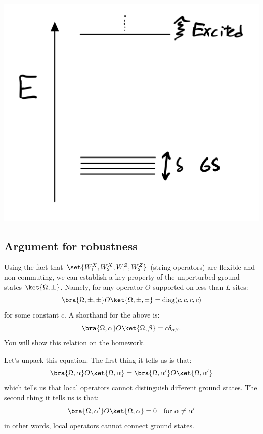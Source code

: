 \begin{center}
    \includegraphics[scale=0.3]{Lectures/Images/lec3-gsmanifold.png}
\end{center}

\subsection{Argument for robustness}
Using the fact that $\set{W_1^X, W_2^X, W_1^Z, W_2^Z}$ (string operators) are flexible and non-commuting, we can establish a key property of the unperturbed ground states $\ket{\Omega, \pm}$. Namely, for any operator $O$ supported on less than $L$ sites:
\begin{equation}\label{eq:star}
    \bra{\Omega, \pm, \pm}O\ket{\Omega, \pm, \pm} = \text{diag}(c, c, c, c)
\end{equation}
for some constant $c$. A shorthand for the above is:
\begin{equation}
    \bra{\Omega, \alpha}O\ket{\Omega, \beta} = c\delta_{\alpha\beta}.
\end{equation}
You will show this relation on the homework.

Let's unpack this equation. The first thing it tells us is that:
\begin{equation}
    \bra{\Omega, \alpha}O\ket{\Omega, \alpha} = \bra{\Omega, \alpha'}O\ket{\Omega, \alpha'}
\end{equation}
which tells us that local operators cannot distinguish different ground states. The second thing it tells us is that:
\begin{equation}
    \bra{\Omega, \alpha'}O\ket{\Omega, \alpha} = 0 \quad \text{for }\alpha \neq \alpha'
\end{equation}
in other words, local operators cannot connect ground states.

